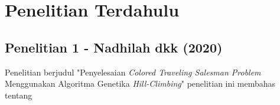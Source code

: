 \section{Penelitian Terdahulu}

\subsection{Penelitian 1 - Nadhilah dkk (2020)}

Penelitian berjudul "Penyelesaian \textit{Colored Traveling Salesman Problem} Menggunakan Algoritma Genetika \textit{Hill-Climbing}" penelitian ini membahas tentang